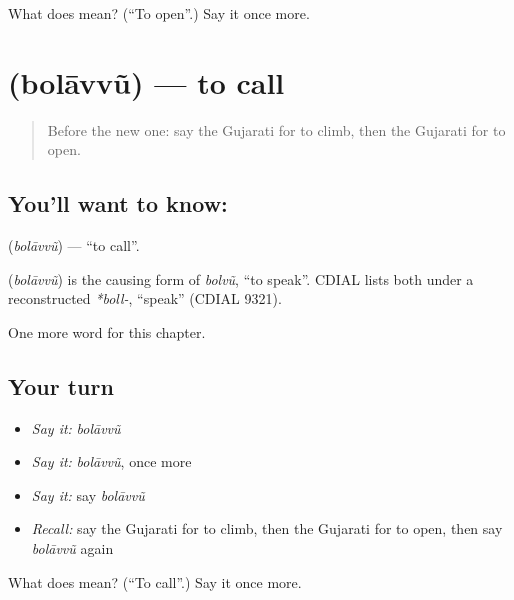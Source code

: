 \begin{tcolorbox}[breakable,colback=teal!4,colframe=teal!35!black,title={Before you move on}]
What does  mean? (\textquotedblleft{}To open\textquotedblright{}.) Say it once more.
\end{tcolorbox}
\section[\texorpdfstring{\gu{બોલાવવું} (bolāvvũ)}{બોલાવવું (bolāvvũ)}]{ (bolāvvũ) — to call}

\label{lesson:GU-C138-bolavvu}



\begin{quote}
Before the new one: say the Gujarati for to climb, then the Gujarati for to open.
\end{quote}

\subsection*{You'll want to know: }
\textbf{} (\emph{bolāvvũ}) — \textquotedblleft{}to call\textquotedblright{}.

\begin{cousinweb}
\textbf{} (\emph{bolāvvũ}) is the causing form of \emph{bolvũ}, \textquotedblleft{}to speak\textquotedblright{}. CDIAL lists both under a reconstructed \emph{*boll-}, \textquotedblleft{}speak\textquotedblright{} (CDIAL 9321).
\end{cousinweb}

\begin{grammarlens}[title={What you've built}]
One more word for this chapter.
\end{grammarlens}

\subsection*{Your turn}
\begin{itemize}
\raggedright
  \item \emph{Say it:} \emph{bolāvvũ}
  \item \emph{Say it:} \emph{bolāvvũ}, once more
  \item \emph{Say it:} say \emph{bolāvvũ}
  \item \emph{Recall:} say the Gujarati for to climb, then the Gujarati for to open, then say \emph{bolāvvũ} again
\end{itemize}

\begin{tcolorbox}[breakable,colback=teal!4,colframe=teal!35!black,title={Before you move on}]
What does  mean? (\textquotedblleft{}To call\textquotedblright{}.) Say it once more.
\end{tcolorbox}
